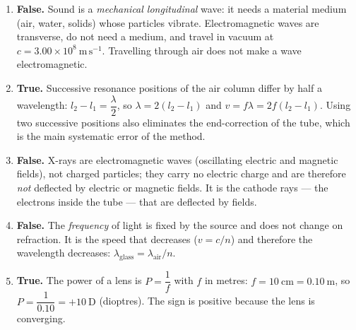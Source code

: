 \documentclass[11pt]{article}
\begin{document}
\begin{corrige}
\begin{enumerate}
\item \textbf{False.} Sound is a \emph{mechanical longitudinal} wave: it needs a material medium (air, water, solids) whose particles vibrate. Electromagnetic waves are transverse, do not need a medium, and travel in vacuum at $c = 3.00\times10^{8}\ \mathrm{m\,s^{-1}}$. Travelling through air does not make a wave electromagnetic.

\item \textbf{True.} Successive resonance positions of the air column differ by half a wavelength: $l_{2}-l_{1} = \dfrac{\lambda}{2}$, so $\lambda = 2(l_{2}-l_{1})$ and $v = f\lambda = 2f(l_{2}-l_{1})$. Using two successive positions also eliminates the end-correction of the tube, which is the main systematic error of the method.

\item \textbf{False.} X-rays are electromagnetic waves (oscillating electric and magnetic fields), not charged particles; they carry no electric charge and are therefore \emph{not} deflected by electric or magnetic fields. It is the cathode rays — the electrons inside the tube — that are deflected by fields.

\item \textbf{False.} The \emph{frequency} of light is fixed by the source and does not change on refraction. It is the speed that decreases ($v = c/n$) and therefore the wavelength decreases: $\lambda_{\text{glass}} = \lambda_{\text{air}}/n$.

\item \textbf{True.} The power of a lens is $P = \dfrac{1}{f}$ with $f$ in metres: $f = 10\ \mathrm{cm} = 0.10\ \mathrm{m}$, so $P = \dfrac{1}{0.10} = +10\ \mathrm{D}$ (dioptres). The sign is positive because the lens is converging.
\end{enumerate}
\end{corrige}
\end{document}
